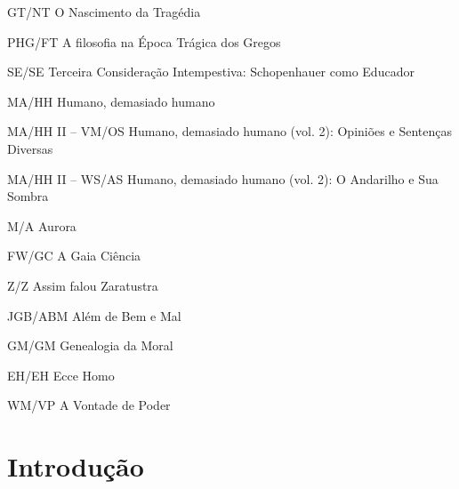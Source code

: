 \documentclass[
	12pt,				%
	openright,			%
	oneside,			%
	a4paper,			%
	english,			%
	french,				%
	spanish,			%
	brazil				%
	]{abntex2}
\begin{document}
\begin{siglas}
\item[GT/NT] O Nascimento da Tragédia
\item[PHG/FT] A filosofia na Época Trágica dos Gregos
\item[SE/SE] Terceira Consideração Intempestiva: Schopenhauer como Educador
\item[MA/HH] Humano, demasiado humano
\item[MA/HH II – VM/OS] Humano, demasiado humano (vol. 2): Opiniões e Sentenças Diversas
\item[MA/HH II – WS/AS] Humano, demasiado humano (vol. 2): O Andarilho e Sua Sombra
\item[M/A] Aurora
\item[FW/GC] A Gaia Ciência
\item[Z/Z] Assim falou Zaratustra
\item[JGB/ABM] Além de Bem e Mal
\item[GM/GM] Genealogia da Moral
\item[EH/EH] Ecce Homo
\item[WM/VP] A Vontade de Poder

\end{siglas}


\tableofcontents*
\cleardoublepage



\textual

\chapter*{Introdução}
\end{document}
